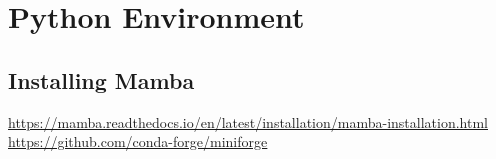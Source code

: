 \section{Python Environment}
\subsection{Installing Mamba}
\noindent \href{https://mamba.readthedocs.io/en/latest/installation/mamba-installation.html}{\color{blue}\underline{https://mamba.readthedocs.io/en/latest/installation/mamba-installation.html}}\\
\href{https://github.com/conda-forge/miniforge}{\color{blue}\underline{https://github.com/conda-forge/miniforge}}


